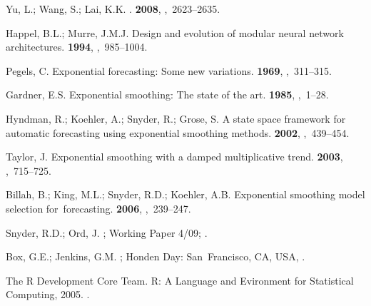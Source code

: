 \documentclass[energies,article,accept,moreauthors,pdftex,12pt,a4paper]{mdpi}
\begin{document}
\begin{thebibliography}{----}
Yu, L.; Wang, S.; Lai, K.K.
.
 {\bf 2008},
,~2623--2635.

Happel, B.L.; Murre, J.M.J.
\newblock Design and evolution of modular neural network architectures.
 {\bf 1994},
,~985--1004.

Pegels, C.
\newblock Exponential forecasting: Some new variations.
 {\bf 1969},
,~311--315.

Gardner, E.S.
\newblock Exponential smoothing: The state of the art.
 {\bf 1985},
,~1--28.

Hyndman, R.; Koehler, A.; Snyder, R.; Grose, S.
\newblock A state space framework for automatic forecasting using exponential smoothing methods.
 {\bf 2002},
,~439--454.

Taylor, J.
\newblock Exponential smoothing with a damped multiplicative trend.
 {\bf 2003},
,~715--725.

Billah, B.; King, M.L.; Snyder, R.D.; Koehler, A.B.
\newblock Exponential smoothing model selection for~forecasting.
 {\bf 2006},
,~239--247.

Snyder, R.D.; Ord, J.
; Working Paper 4/09;
\newblock
{}.

Box, G.E.; Jenkins, G.M.
; Honden Day: San~Francisco, CA, USA, 
.

{ The R Development Core Team}.
\newblock R: A Language and Evironment for Statistical Computing, 2005.
\newblock
{}.


\end{thebibliography}
\end{document}
